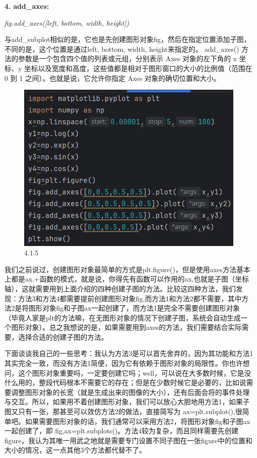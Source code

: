 \documentclass[12pt]{article}
\begin{document}
\noindent\textbf{\large 4. add\_axes:}

\textit{fig.add\_axes([left, bottom, width, height])}

与add\_subplot相似的是，它也是先创建图形对象fig，然后在指定位置添加子图，不同的是，这个位置是通过left, bottom, width, height来指定的。
  add\_axes()   方法的参数是一个包含四个值的列表或元组，分别表示   Axes   对象的左下角的 x 坐标、y 坐标以及宽度和高度，这些值都是相对于图形窗口的大小的比例值（范围在 0 到 1 之间）。也就是说，它允许你指定   Axes   对象的确切位置和大小。

  \begin{figure}[H]
      \centering
      \includegraphics[width=0.75\linewidth]{创建子图 program3.png}
      \caption{4.1.5}
      \label{fig:enter-label}
  \end{figure}
我们之前说过，创建图形对象最简单的方式是plt.figure()，但是使用axes方法基本上都是ax.+函数的模式，就是说，你得先有函数可以作用的ax,也就是子图（坐标轴），这就需要用到上面介绍的四种创建子图的方法。比较这四种方法，我们发现：方法3和方法4都需要提前创建图形对象fig,而方法1和方法2都不需要，其中方法2是将图形对象fig和子图ax一起创建了，而方法1是完全不需要创建图形对象（毕竟人家是plt的方法嘛，在无图形对象的情况下创建子图，系统会自动生成一个图形对象）。总之我想说的是，如果需要用到axes的方法，我们需要结合实际需要，选择合适的创建子图的方法。

下面谈谈我自己的一些思考：我认为方法3是可以首先舍弃的，因为其功能和方法1其实完全一致，而没有方法1简便，因为它有依赖于图形对象的局限性。你也许想问，这个图形对象重要吗，一定要创建它吗；well，可以说在大多数时候，它是没什么用的，整段代码根本不需要它的存在；但是在少数时候它是必要的，比如说需要调整图形对象的长宽（就是生成出来的图像的大小），还有后面会将的事件处理与交互。所以，如果用不着创建图形对象，我们可以放心大胆地用方法1，如果子图又只有一张，那甚至可以效仿方法2的做法，直接简写为 ax=plt.subplot(),很简单吧。如果需要图形对象的话，我们通常可以采用方法2，将图形对象fig和子图ax一起创建了，即 fig,ax=plt.subplots()。方法4较为复杂，而且同样需要先创建figure，我认为其唯一用武之地就是需要专门设置不同子图在一张figure中的位置和大小的情况，这一点其他3个方法都代替不了。  
\end{document}
